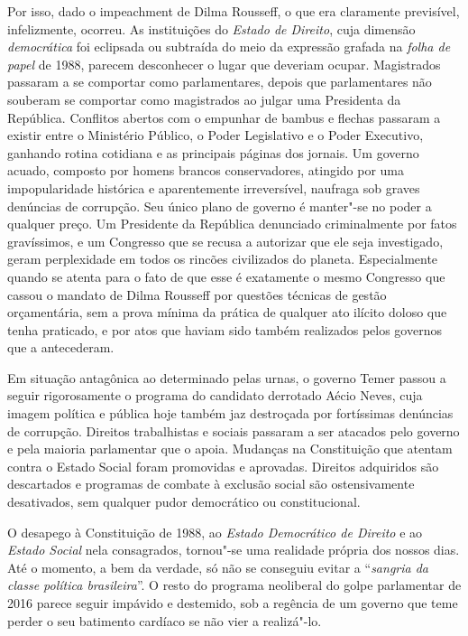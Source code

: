 Por isso, dado o impeachment de Dilma Rousseff, o que era
claramente previsível, infelizmente, ocorreu. As instituições do
\emph{Estado de Direito}, cuja dimensão \emph{democrática} foi eclipsada
ou subtraída do meio da expressão grafada na \emph{folha de papel} de
1988, parecem desconhecer o lugar que deveriam ocupar. Magistrados
passaram a se comportar como parlamentares, depois que parlamentares não
souberam se comportar como magistrados ao julgar uma Presidenta da
República. Conflitos abertos com o empunhar de bambus e flechas passaram
a existir entre o Ministério Público, o Poder Legislativo e o Poder
Executivo, ganhando rotina cotidiana e as principais páginas dos
jornais. Um governo acuado, composto por homens brancos conservadores,
atingido por uma impopularidade histórica e aparentemente irreversível,
naufraga sob graves denúncias de corrupção. Seu único plano de governo é
manter"-se no poder a qualquer preço. Um Presidente da República
denunciado criminalmente por fatos gravíssimos, e um Congresso que se
recusa a autorizar que ele seja investigado, geram perplexidade em todos
os rincões civilizados do planeta. Especialmente quando se atenta para o
fato de que esse é exatamente o mesmo Congresso que cassou o mandato de
Dilma Rousseff por questões técnicas de gestão orçamentária, sem a prova
mínima da prática de qualquer ato ilícito doloso que tenha praticado, e
por atos que haviam sido também realizados pelos governos que a
antecederam.

Em situação antagônica ao determinado pelas urnas, o governo Temer
passou a seguir rigorosamente o programa do candidato derrotado Aécio
Neves, cuja imagem política e pública hoje também jaz destroçada por
fortíssimas denúncias de corrupção. Direitos trabalhistas e sociais
passaram a ser atacados pelo governo e pela maioria parlamentar que o
apoia. Mudanças na Constituição que atentam contra o Estado Social foram
promovidas e aprovadas. Direitos adquiridos são descartados e programas
de combate à exclusão social são ostensivamente desativados, sem
qualquer pudor democrático ou constitucional.

O desapego à Constituição de 1988, ao \emph{Estado Democrático de
Direito} e ao \emph{Estado Social} nela consagrados, tornou"-se uma
realidade própria dos nossos dias. Até o momento, a bem da verdade, só
não se conseguiu evitar a ``\emph{sangria da classe política
brasileira}''. O resto do programa neoliberal do golpe parlamentar de
2016 parece seguir impávido e destemido, sob a regência de um governo
que teme perder o seu batimento cardíaco se não vier a realizá"-lo.

